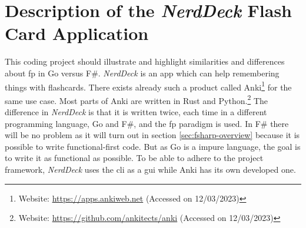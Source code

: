     \section{Description of the \textit{NerdDeck} Flash Card Application}\label{sec:description}
    This coding project should illustrate and highlight similarities and differences about \ac{fp} in Go versus F\#.
    \textit{NerdDeck} is an \ac{app} which can help remembering things with flashcards. There exists already such a product called Anki\footnote{Website: \url{https://apps.ankiweb.net} (Accessed on 12/03/2023)} for the same use case. Most parts of Anki are written in Rust and Python.\footnote{Website: \url{https://github.com/ankitects/anki} (Accessed on 12/03/2023)} The difference in \textit{NerdDeck} is that it is written twice, each time in a different programming language, Go and F\#, and the \ac{fp} paradigm is used. In F\# there will be no problem as it will turn out in section \ref{sec:fsharp-overview} because it is possible to write functional-first code. But as Go is a impure language, the goal is to write it as functional as possible. To be able to adhere to the project framework, \textit{NerdDeck} uses the \ac{cli} as a \ac{gui} while Anki has its own developed one.


